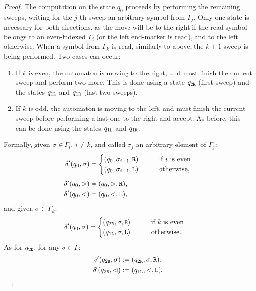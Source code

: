\begin{proof}
	The computation on the state $q_0$ proceeds by performing the remaining sweeps, writing for the $j$-th sweep an arbitrary symbol from $\Gamma_j$.
	Only one state is necessary for both directions, as the move will be to the right if the read symbol belongs to an even-indexed $\Gamma_i$ (or the left end-marker is read), and to the left otherwise.
	When a symbol from $\Gamma_k$ is read, similarly to above, the $k+1$ sweep is being performed. Two cases can occur:
	\begin{enumerate}
		\item If $k$ is even, the automaton is moving to the right, and must finish the current sweep and perform two more. This is done using a state $q_{2\mathtt{R}}$ (first sweep) and the states $q_{1\mathtt{L}}$ and $q_{1\mathtt{R}}$ (last two sweeps).
		\item If $k$ is odd, the automaton is moving to the left, and must finish the current sweep before performing a last one to the right and accept. As before, this can be done using the states $q_{1\mathtt{L}}$ and $q_{1\mathtt{R}}$.
	\end{enumerate}

	Formally, given $\sigma\in\Gamma_i$, $i\ne k$, and called $\sigma_j$ an arbitrary element of $\Gamma_j$:
	\begin{align*}
		\delta'(q_0,\sigma) & = \begin{cases}
			                        (q_0,\sigma_{i+1},\mathtt R) \qquad & \text{if $i$ is even}   \\
			                        (q_0,\sigma_{i+1},\mathtt L) \qquad & \text{otherwise} \text,
		                        \end{cases} \\[1ex]
		\delta'(q_0,\rhd)   & = (q_0,\rhd,\mathtt R) \text,                                   \\
		\delta'(q_0,\lhd)   & = (q_0,\lhd,\mathtt L) \text,
	\end{align*}
	and given $\sigma\in\Gamma_k$:
	\begin{align*}
		\delta'(q_0,\sigma) & = \begin{cases}
			                        (q_{2\mathtt{R}},\sigma,\mathtt R) \qquad & \text{if $k$ is even}   \\
			                        (q_{1\mathtt{L}},\sigma,\mathtt L) \qquad  & \text{otherwise} \text.
		                        \end{cases}
	\end{align*}
	As for $q_{2\mathtt{R}}$, for any $\sigma\in\Gamma$:
	\begin{align*}
		\delta'(q_{2\mathtt{R}},\sigma) & :=(q_{2\mathtt{R}},\sigma,\mathtt R) \text,       \\
		\delta'(q_{2\mathtt{R}},\lhd)   & :=(q_{1\mathtt{L}},\lhd,\mathtt L) \text. \qedhere
	\end{align*}
\end{proof}

